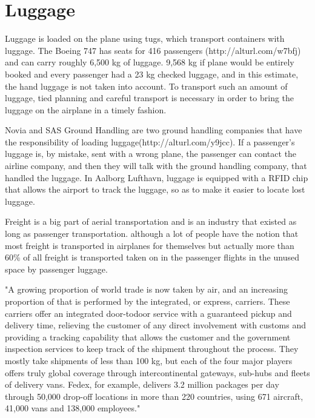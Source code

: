 \section{Luggage}
Luggage is loaded on the plane using tugs, which transport containers with luggage. The Boeing 747 has seats for 416 passengers (http://alturl.com/w7bfj) and can carry roughly 6,500 kg of luggage. %
9,568 kg if plane would be entirely booked and every passenger had a 23 kg checked luggage, and in this estimate, the hand luggage is not taken into account. To transport such an amount of luggage, tied planning and careful transport is necessary in order to bring the luggage on the airplane in a timely fashion. %


Novia and SAS Ground Handling are two ground handling companies that have the responsibility of loading luggage(http://alturl.com/y9jcc). If a passenger's luggage is, by mistake, sent with a wrong plane, the passenger can contact the airline company, and then they will talk with the ground handling company, that handled the luggage. In Aalborg Lufthavn, luggage is equipped with a RFID chip that allows the airport to track the luggage, so as to make it easier to locate lost luggage.


Freight is a big part of aerial transportation and is an industry that existed as long as passenger transportation. although a lot of people have the notion that most freight is transported in airplanes for themselves but actually more than 60\% of all freight is transported taken on in the passenger flights in the unused space by passenger luggage.

"A growing proportion of world trade is now taken by air, and an increasing proportion of that is performed by the integrated, or express, carriers. These carriers offer an integrated door-todoor service with a guaranteed pickup and delivery time, relieving the customer of any direct involvement with customs and providing a tracking capability that allows the customer and the government inspection services to keep track of the shipment throughout the process. They mostly take shipments of less than 100 kg, but each of the four major players offers truly global coverage through intercontinental gateways, sub-hubs and fleets of delivery vans. Fedex, for example, delivers 3.2 million packages per day through 50,000 drop-off locations in more than 220 countries, using 671 aircraft, 41,000 vans and 138,000 employees."


